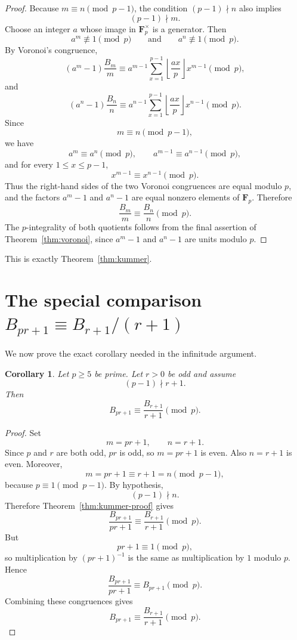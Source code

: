 \documentclass[11pt]{article}
\newtheorem{corollary}[theorem]{Corollary}
\newcommand{\Fp}{\mathbf F_p}
\newcommand{\Bern}{B}
\newcommand{\floor}[1]{\left\lfloor #1\right\rfloor}
\begin{document}
\begin{proof}
Because $m\equiv n\pmod {p-1}$, the condition $(p-1)\nmid n$ also implies
\[
  (p-1)\nmid m.
\]
Choose an integer $a$ whose image in $\Fp^\times$ is a generator.  Then
\[
  a^m\not\equiv1\pmod p
  \qquad\text{and}\qquad
  a^n\not\equiv1\pmod p.
\]
By Voronoi's congruence,
\[
  (a^m-1)\frac{\Bern_m}{m}
  \equiv
  a^{m-1}\sum_{x=1}^{p-1}\floor{\frac{a x}{p}}x^{m-1}
  \pmod p,
\]
and
\[
  (a^n-1)\frac{\Bern_n}{n}
  \equiv
  a^{n-1}\sum_{x=1}^{p-1}\floor{\frac{a x}{p}}x^{n-1}
  \pmod p.
\]
Since
\[
  m\equiv n\pmod {p-1},
\]
we have
\[
  a^m\equiv a^n\pmod p,
  \qquad
  a^{m-1}\equiv a^{n-1}\pmod p,
\]
and for every $1\le x\le p-1$,
\[
  x^{m-1}\equiv x^{n-1}\pmod p.
\]
Thus the right-hand sides of the two Voronoi congruences are equal modulo
$p$, and the factors $a^m-1$ and $a^n-1$ are equal nonzero elements of
$\Fp$.  Therefore
\[
  \frac{\Bern_m}{m}\equiv\frac{\Bern_n}{n}\pmod p.
\]
The $p$-integrality of both quotients follows from the final assertion of
Theorem~\ref{thm:voronoi}, since $a^m-1$ and $a^n-1$ are units modulo $p$.
\end{proof}

This is exactly Theorem~\ref{thm:kummer}.

\section{The special comparison $\Bern_{pr+1}\equiv\Bern_{r+1}/(r+1)$}

We now prove the exact corollary needed in the infinitude argument.

\begin{corollary}\label{cor:special}
Let $p\ge5$ be prime.  Let $r>0$ be odd and assume
\[
  (p-1)\nmid r+1.
\]
Then
\[
  \Bern_{pr+1}\equiv \frac{\Bern_{r+1}}{r+1}\pmod p.
\]
\end{corollary}

\begin{proof}
Set
\[
  m=pr+1,
  \qquad
  n=r+1.
\]
Since $p$ and $r$ are both odd, $pr$ is odd, so $m=pr+1$ is even.
Also $n=r+1$ is even.  Moreover,
\[
  m=pr+1\equiv r+1=n\pmod {p-1},
\]
because $p\equiv1\pmod {p-1}$.  By hypothesis,
\[
  (p-1)\nmid n.
\]
Therefore Theorem~\ref{thm:kummer-proof} gives
\[
  \frac{\Bern_{pr+1}}{pr+1}
  \equiv
  \frac{\Bern_{r+1}}{r+1}
  \pmod p.
\]
But
\[
  pr+1\equiv1\pmod p,
\]
so multiplication by $(pr+1)^{-1}$ is the same as multiplication by $1$
modulo $p$.  Hence
\[
  \frac{\Bern_{pr+1}}{pr+1}
  \equiv
  \Bern_{pr+1}
  \pmod p.
\]
Combining these congruences gives
\[
  \Bern_{pr+1}
  \equiv
  \frac{\Bern_{r+1}}{r+1}
  \pmod p.
\]
\end{proof}
\end{document}
